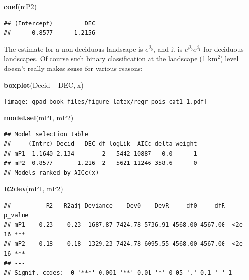 \documentclass[12pt,]{book}
\newenvironment{Shaded}{\begin{snugshade}}{\end{snugshade}}
\newcommand{\KeywordTok}[1]{\textcolor[rgb]{0.13,0.29,0.53}{\textbf{#1}}}
\newcommand{\NormalTok}[1]{#1}
\newcommand{\OperatorTok}[1]{\textcolor[rgb]{0.81,0.36,0.00}{\textbf{#1}}}
\newcommand{\StringTok}[1]{\textcolor[rgb]{0.31,0.60,0.02}{#1}}
\begin{document}
\begin{Shaded}
\begin{Highlighting}[]
\KeywordTok{coef}\NormalTok{(mP2)}
\end{Highlighting}
\end{Shaded}

\begin{verbatim}
## (Intercept)         DEC 
##     -0.8577      1.2156
\end{verbatim}

The estimate for a non-deciduous landscape is
\(e^{\beta_0}\), and it is \(e^{\beta_0}e^{\beta_1}\) for deciduous landscapes.
Of course such binary classification at the landscape (1 km\(^2\)) level
doesn't really makes sense for various reasons:

\begin{Shaded}
\begin{Highlighting}[]
\KeywordTok{boxplot}\NormalTok{(Decid }\OperatorTok{~}\StringTok{ }\NormalTok{DEC, x)}
\end{Highlighting}
\end{Shaded}

\texttt{[image: qpad-book\_files/figure-latex/regr-pois\_cat1-1.pdf]}

\begin{Shaded}
\begin{Highlighting}[]
\KeywordTok{model.sel}\NormalTok{(mP1, mP2)}
\end{Highlighting}
\end{Shaded}

\begin{verbatim}
## Model selection table 
##     (Intrc) Decid   DEC df logLik  AICc delta weight
## mP1 -1.1640 2.134        2  -5442 10887   0.0      1
## mP2 -0.8577       1.216  2  -5621 11246 358.6      0
## Models ranked by AICc(x)
\end{verbatim}

\begin{Shaded}
\begin{Highlighting}[]
\KeywordTok{R2dev}\NormalTok{(mP1, mP2)}
\end{Highlighting}
\end{Shaded}

\begin{verbatim}
##          R2   R2adj Deviance    Dev0    DevR     df0     dfR p_value    
## mP1    0.23    0.23  1687.87 7424.78 5736.91 4568.00 4567.00  <2e-16 ***
## mP2    0.18    0.18  1329.23 7424.78 6095.55 4568.00 4567.00  <2e-16 ***
## ---
## Signif. codes:  0 '***' 0.001 '**' 0.01 '*' 0.05 '.' 0.1 ' ' 1
\end{verbatim}
\end{document}
